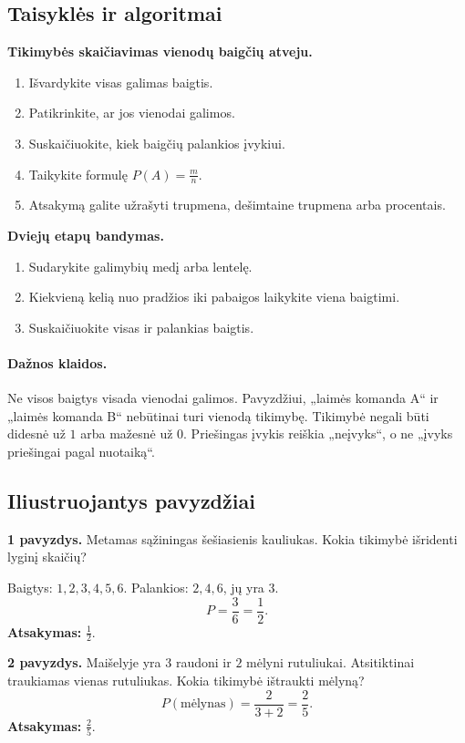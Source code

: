 \subsection{Taisyklės ir algoritmai}
\textbf{Tikimybės skaičiavimas vienodų baigčių atveju.}
\begin{enumerate}[label=\arabic*.]
\item Išvardykite visas galimas baigtis.
\item Patikrinkite, ar jos vienodai galimos.
\item Suskaičiuokite, kiek baigčių palankios įvykiui.
\item Taikykite formulę \(P(A)=\frac{m}{n}\).
\item Atsakymą galite užrašyti trupmena, dešimtaine trupmena arba procentais.
\end{enumerate}

\textbf{Dviejų etapų bandymas.}
\begin{enumerate}[label=\arabic*.]
\item Sudarykite galimybių medį arba lentelę.
\item Kiekvieną kelią nuo pradžios iki pabaigos laikykite viena baigtimi.
\item Suskaičiuokite visas ir palankias baigtis.
\end{enumerate}

\paragraph{Dažnos klaidos.}
Ne visos baigtys visada vienodai galimos. Pavyzdžiui, „laimės komanda A“ ir „laimės komanda B“ nebūtinai turi vienodą tikimybę. Tikimybė negali būti didesnė už \(1\) arba mažesnė už \(0\). Priešingas įvykis reiškia „neįvyks“, o ne „įvyks priešingai pagal nuotaiką“.

\subsection{Iliustruojantys pavyzdžiai}
\textbf{1 pavyzdys.} Metamas sąžiningas šešiasienis kauliukas. Kokia tikimybė išridenti lyginį skaičių?

Baigtys: \(1,2,3,4,5,6\). Palankios: \(2,4,6\), jų yra \(3\).
\[
P=\frac{3}{6}=\frac{1}{2}.
\]
\textbf{Atsakymas:} \(\frac{1}{2}\).

\textbf{2 pavyzdys.} Maišelyje yra \(3\) raudoni ir \(2\) mėlyni rutuliukai. Atsitiktinai traukiamas vienas rutuliukas. Kokia tikimybė ištraukti mėlyną?
\[
P(\text{mėlynas})=\frac{2}{3+2}=\frac{2}{5}.
\]
\textbf{Atsakymas:} \(\frac{2}{5}\).

